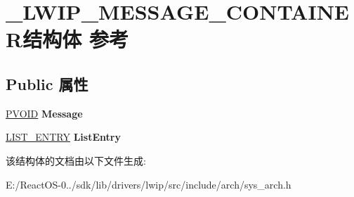 \hypertarget{struct___l_w_i_p___m_e_s_s_a_g_e___c_o_n_t_a_i_n_e_r}{}\section{\+\_\+\+L\+W\+I\+P\+\_\+\+M\+E\+S\+S\+A\+G\+E\+\_\+\+C\+O\+N\+T\+A\+I\+N\+E\+R结构体 参考}
\label{struct___l_w_i_p___m_e_s_s_a_g_e___c_o_n_t_a_i_n_e_r}
\subsection*{Public 属性}
\begin{DoxyCompactItemize}
\item 
\mbox{\label{struct___l_w_i_p___m_e_s_s_a_g_e___c_o_n_t_a_i_n_e_r_ab82becb48cdb3eacf91e438a46f490f5}} 
\hyperlink{interfacevoid}{P\+V\+O\+ID} {\bfseries Message}
\item 
\mbox{\label{struct___l_w_i_p___m_e_s_s_a_g_e___c_o_n_t_a_i_n_e_r_aaf844f7f3998535d75c7c3dfac4164b4}} 
\hyperlink{struct___l_i_s_t___e_n_t_r_y}{L\+I\+S\+T\+\_\+\+E\+N\+T\+RY} {\bfseries List\+Entry}
\end{DoxyCompactItemize}


该结构体的文档由以下文件生成\+:\begin{DoxyCompactItemize}
\item 
E\+:/\+React\+O\+S-\/0../sdk/lib/drivers/lwip/src/include/arch/sys\+\_\+arch.\+h\end{DoxyCompactItemize}
